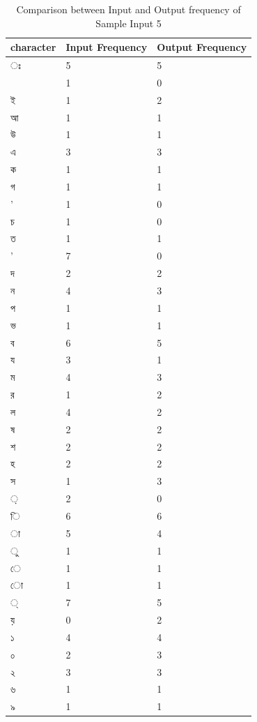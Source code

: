 \begin{table}[H]
\centering
\begin{tabular}{|p{2cm}|p{2cm}|p{2cm}|}
\hline
character & Input Frequency & Output Frequency \\
\hline
{\bengalifont ঃ} & 5 & 5\\
\hline
{\bengalifont 0} & 1 & 0\\
\hline
{\bengalifont ই} & 1 & 2\\
\hline
{\bengalifont আ} & 1 & 1\\
\hline
{\bengalifont উ} & 1 & 1\\
\hline
{\bengalifont এ} & 3 & 3\\
\hline
{\bengalifont ক} & 1 & 1\\
\hline
{\bengalifont গ} & 1 & 1\\
\hline
{\bengalifont ’} & 1 & 0\\
\hline
{\bengalifont চ} & 1 & 0\\
\hline
{\bengalifont ত} & 1 & 1\\
\hline
{\bengalifont '} & 7 & 0\\
\hline
{\bengalifont দ} & 2 & 2\\
\hline
{\bengalifont ন} & 4 & 3\\
\hline
{\bengalifont প} & 1 & 1\\
\hline
{\bengalifont ভ} & 1 & 1\\
\hline
{\bengalifont ব} & 6 & 5\\
\hline
{\bengalifont য} & 3 & 1\\
\hline
{\bengalifont ম} & 4 & 3\\
\hline
{\bengalifont র} & 1 & 2\\
\hline
{\bengalifont ল} & 4 & 2\\
\hline
{\bengalifont ষ} & 2 & 2\\
\hline
{\bengalifont শ} & 2 & 2\\
\hline
{\bengalifont হ} & 2 & 2\\
\hline
{\bengalifont স} & 1 & 3\\
\hline
{\bengalifont ়} & 2 & 0\\
\hline
{\bengalifont ি} & 6 & 6\\
\hline
{\bengalifont া} & 5 & 4\\
\hline
{\bengalifont ু} & 1 & 1\\
\hline
{\bengalifont ে} & 1 & 1\\
\hline
{\bengalifont ো} & 1 & 1\\
\hline
{\bengalifont ্} & 7 & 5\\
\hline
{\bengalifont য়} & 0 & 2\\
\hline
{\bengalifont ১} & 4 & 4\\
\hline
{\bengalifont ০} & 2 & 3\\
\hline
{\bengalifont ২} & 3 & 3\\
\hline
{\bengalifont ৬} & 1 & 1\\
\hline
{\bengalifont ৯} & 1 & 1\\
\hline
\end{tabular}
\caption { Comparison between Input and Output frequency of Sample Input 5}
\label {tab:BTable5}
\end{table}

